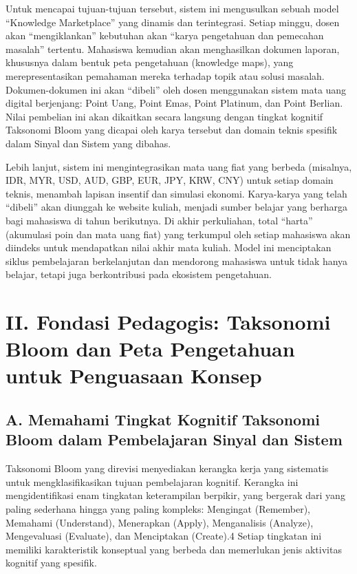 \documentclass[
  letterpaper,
  DIV=11,
  numbers=noendperiod]{scrreprt}
\begin{document}
Untuk mencapai tujuan-tujuan tersebut, sistem ini mengusulkan sebuah
model ``Knowledge Marketplace'' yang dinamis dan terintegrasi. Setiap
minggu, dosen akan ``mengiklankan'' kebutuhan akan ``karya pengetahuan
dan pemecahan masalah'' tertentu. Mahasiswa kemudian akan menghasilkan
dokumen laporan, khususnya dalam bentuk peta pengetahuan (knowledge
maps), yang merepresentasikan pemahaman mereka terhadap topik atau
solusi masalah. Dokumen-dokumen ini akan ``dibeli'' oleh dosen
menggunakan sistem mata uang digital berjenjang: Point Uang, Point Emas,
Point Platinum, dan Point Berlian. Nilai pembelian ini akan dikaitkan
secara langsung dengan tingkat kognitif Taksonomi Bloom yang dicapai
oleh karya tersebut dan domain teknis spesifik dalam Sinyal dan Sistem
yang dibahas.

Lebih lanjut, sistem ini mengintegrasikan mata uang fiat yang berbeda
(misalnya, IDR, MYR, USD, AUD, GBP, EUR, JPY, KRW, CNY) untuk setiap
domain teknis, menambah lapisan insentif dan simulasi ekonomi.
Karya-karya yang telah ``dibeli'' akan diunggah ke website kuliah,
menjadi sumber belajar yang berharga bagi mahasiswa di tahun berikutnya.
Di akhir perkuliahan, total ``harta'' (akumulasi poin dan mata uang
fiat) yang terkumpul oleh setiap mahasiswa akan diindeks untuk
mendapatkan nilai akhir mata kuliah. Model ini menciptakan siklus
pembelajaran berkelanjutan dan mendorong mahasiswa untuk tidak hanya
belajar, tetapi juga berkontribusi pada ekosistem pengetahuan.

\section{II. Fondasi Pedagogis: Taksonomi Bloom dan Peta Pengetahuan
untuk Penguasaan
Konsep}\label{ii.-fondasi-pedagogis-taksonomi-bloom-dan-peta-pengetahuan-untuk-penguasaan-konsep}

\subsection{A. Memahami Tingkat Kognitif Taksonomi Bloom dalam
Pembelajaran Sinyal dan
Sistem}\label{a.-memahami-tingkat-kognitif-taksonomi-bloom-dalam-pembelajaran-sinyal-dan-sistem}

Taksonomi Bloom yang direvisi menyediakan kerangka kerja yang sistematis
untuk mengklasifikasikan tujuan pembelajaran kognitif. Kerangka ini
mengidentifikasi enam tingkatan keterampilan berpikir, yang bergerak
dari yang paling sederhana hingga yang paling kompleks: Mengingat
(Remember), Memahami (Understand), Menerapkan (Apply), Menganalisis
(Analyze), Mengevaluasi (Evaluate), dan Menciptakan (Create).4 Setiap
tingkatan ini memiliki karakteristik konseptual yang berbeda dan
memerlukan jenis aktivitas kognitif yang spesifik.
\end{document}
